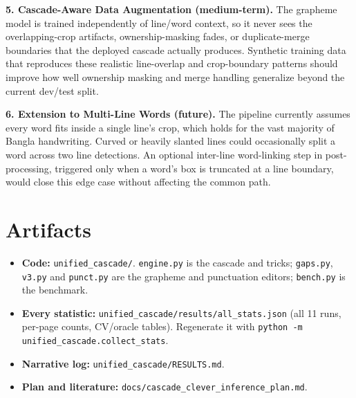 \documentclass[10.5pt,a4paper]{article}
\begin{document}
\textbf{5. Cascade-Aware Data Augmentation (medium-term).} The grapheme model is trained independently of line/word context, so it never sees the overlapping-crop artifacts, ownership-masking fades, or duplicate-merge boundaries that the deployed cascade actually produces. Synthetic training data that reproduces these realistic line-overlap and crop-boundary patterns should improve how well ownership masking and merge handling generalize beyond the current dev/test split.

\textbf{6. Extension to Multi-Line Words (future).} The pipeline currently assumes every word fits inside a single line's crop, which holds for the vast majority of Bangla handwriting. Curved or heavily slanted lines could occasionally split a word across two line detections. An optional inter-line word-linking step in post-processing, triggered only when a word's box is truncated at a line boundary, would close this edge case without affecting the common path.

\section*{Artifacts}
\begin{itemize}
  \item \textbf{Code:} \texttt{unified\_cascade/}. \texttt{engine.py} is the cascade and tricks;
        \texttt{gaps.py}, \texttt{v3.py} and \texttt{punct.py} are the grapheme and punctuation
        editors; \texttt{bench.py} is the benchmark.
  \item \textbf{Every statistic:} \texttt{unified\_cascade/results/all\_stats.json} (all 11 runs,
        per-page counts, CV/oracle tables). Regenerate it with
        \texttt{python -m unified\_cascade.collect\_stats}.
  \item \textbf{Narrative log:} \texttt{unified\_cascade/RESULTS.md}.
  \item \textbf{Plan and literature:} \texttt{docs/cascade\_clever\_inference\_plan.md}.
\end{itemize}
\end{document}
